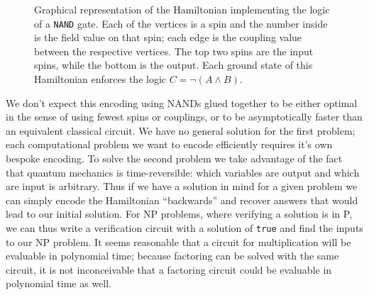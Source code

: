 \begin{figure}
	\begin{center}
\end{center}
	\caption[\texttt{NAND} Graph]{Graphical representation of the Hamiltonian implementing the logic of a \texttt{NAND} gate.  Each of the vertices is a spin and the number inside is the field value on that spin; each edge is the coupling value between the respective vertices.  The top two spins are the input spins, while the bottom is the output.  Each ground state of this Hamiltonian enforces the logic $C = \neg(A \wedge B)$.}
	\label{fig:nand_graph}
\end{figure}


We don't expect this encoding using NANDs glued together to be either optimal in the sense of using fewest spins or couplings, or to be asymptotically faster than an equivalent classical circuit.  We have no general solution for the first problem; each computational problem we want to encode efficiently requires it's own bespoke encoding.  
To solve the second problem we take advantage of the fact that quantum mechanics is time-reversible: which variables are output and which are input is arbitrary.  
Thus if we have a solution in mind for a given problem we can simply encode the Hamiltonian ``backwards'' and recover answers that would lead to our initial solution.  For NP problems, where verifying a solution is in P, we can thus write a verification circuit with a solution of \texttt{true} and find the inputs to our NP problem.
It seems reasonable that a circuit for multiplication will be evaluable in polynomial time; because factoring can be solved with the same circuit, it is not inconceivable that a factoring circuit could be evaluable in polynomial time as well.

